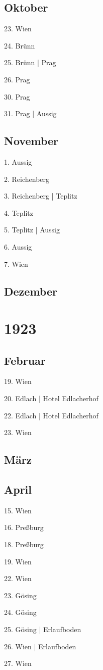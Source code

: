 \documentclass[twoside=false,titlepage=false,open=any, parskip=never, fontsize=10pt, headings=small, chapterprefix=false, appendixprefix=false, DIV=15]{scrbook}
\begin{document}
\begin{multicols}{3}
            \section*{Oktober}
            23. Wien\par
            24. Brünn\par
            25. Brünn | Prag\par
            26. Prag\par
            30. Prag\par
            31. Prag | Aussig\par
            \section*{November}
            1. Aussig\par
            2. Reichenberg\par
            3. Reichenberg | Teplitz\par
            4. Teplitz\par
            5. Teplitz | Aussig\par
            6. Aussig\par
            7. Wien\par
            \section*{Dezember}
            \chapter*{1923}
            \section*{Februar}
            19. Wien\par
            20. Edlach | Hotel Edlacherhof\par
            22. Edlach | Hotel Edlacherhof\par
            23. Wien\par
            \section*{März}
            \section*{April}
            15. Wien\par
            16. Preßburg\par
            18. Preßburg\par
            19. Wien\par
            22. Wien\par
            23. Gösing\par
            24. Gösing\par
            25. Gösing | Erlaufboden\par
            26. Wien | Erlaufboden\par
            27. Wien\par

\end{multicols}
\end{document}

